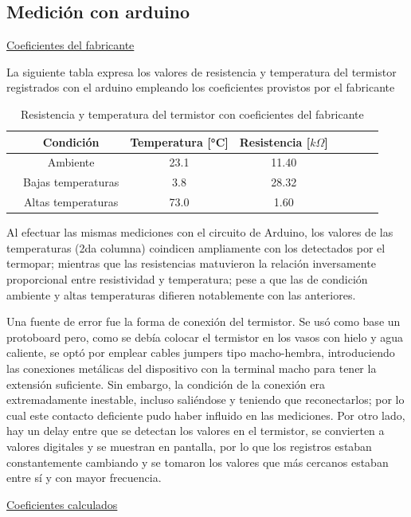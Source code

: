 \subsection{Medición con arduino}
\underline{Coeficientes del fabricante}

La siguiente tabla expresa los valores de resistencia y temperatura del termistor registrados con el arduino empleando los coeficientes provistos por el fabricante
\begin{table}[H]
    \centering
    \footnotesize
    \caption{Resistencia y temperatura del termistor con coeficientes del fabricante}
    \begin{tabular}{lccccccc}
    \toprule
    & Condición & Temperatura [°C] & Resistencia [$ k\Omega$] \\
    \midrule
        & Ambiente & 23.1 & 11.40  \\
        & Bajas temperaturas & 3.8 & 28.32  \\
        & Altas temperaturas & 73.0 & 1.60 \\
    \bottomrule
    \end{tabular}
    \end{table}
    \vspace{-0.5cm}
Al efectuar las mismas mediciones con el circuito de Arduino, los valores de las temperaturas (2da columna) coindicen ampliamente con los detectados por el termopar; mientras que 
las resistencias matuvieron la relación inversamente proporcional entre resistividad y temperatura; pese a que las de condición ambiente y altas temperaturas difieren notablemente con las anteriores.

Una fuente de error fue la forma de conexión del termistor. Se usó como base un protoboard pero, como se debía colocar el termistor en los vasos con hielo y agua caliente, se optó por
emplear cables jumpers tipo macho-hembra, introduciendo las conexiones metálicas del dispositivo con la terminal macho para tener la extensión suficiente. Sin embargo,
la condición de la conexión era extremadamente inestable, incluso saliéndose y teniendo que reconectarlos; por lo cual este contacto deficiente pudo haber influido en las mediciones. Por otro lado, hay un delay entre que se detectan los valores en el termistor, se
convierten a valores digitales y se muestran en pantalla, por lo que los registros estaban constantemente cambiando y se tomaron los valores que más cercanos estaban entre sí y con mayor frecuencia. 

\underline{Coeficientes calculados}

